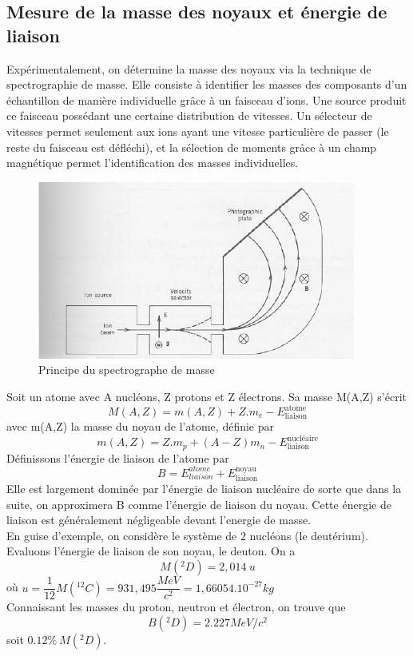\subsection{Mesure de la masse des noyaux et énergie de liaison}
    
Expérimentalement, on détermine la masse des noyaux via la technique de spectrographie de masse. Elle consiste à identifier les masses des composants d'un échantillon de manière individuelle grâce à un faisceau d'ions. Une source produit ce faisceau possédant une certaine distribution de vitesses. Un sélecteur de vitesses permet seulement aux ions ayant une vitesse particulière de passer (le reste du faisceau est défléchi), et la sélection de moments grâce à un champ magnétique permet l'identification des masses individuelles. 
    
    \begin{figure}[ht]
        \centering
        \includegraphics[scale=0.80]{Images1/spectro.PNG}
        \caption{Principe du spectrographe de masse}
    \end{figure}
Soit un atome avec A nucléons, Z protons et Z électrons. Sa masse M(A,Z) s'écrit
    \[
        M(A,Z) = m(A,Z) + Z.m_e - E^{\text{atome}}_{\text{liaison}}
    \]
avec m(A,Z) la masse du noyau de l'atome, définie par 
    \[
    m(A,Z)=Z.m_p+(A-Z)m_n-E^{\text{nucléaire}}_{\text{liaison}}
    \]
Définissons l'énergie de liaison de l'atome par 
    \[
        B=E^{atome}_{liaison}+E^{\text{noyau}}_{\text{liaison}}
    \]
Elle est largement dominée par l'énergie de liaison nucléaire de sorte que dans la suite, on approximera B comme l'énergie de liaison du noyau. Cette énergie de liaison est généralement négligeable devant l'energie de masse. \\[0,2cm]
En guise d'exemple, on considère le système de 2 nucléons (le deutérium). Evaluons l'énergie de liaison de son noyau, le deuton. On a 
    \[
        M(^{2}_{}D)=2,014~u
    \] 
où $u=\dfrac{1}{12}M(^{12}_{}C)=931,495\dfrac{MeV}{c^2}=1,66054.10^{-27}kg$\\[0,2cm]
Connaissant les masses du proton, neutron et électron, on trouve que
    \[
        B(^{2}_{}D) = 2.227MeV/c^2
    \]
soit $0.12\%~M(^{2}_{}D)$.

